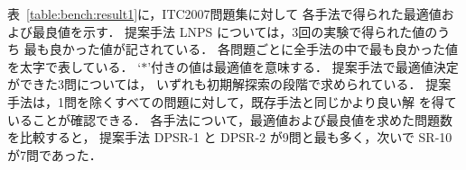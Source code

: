 
表~\ref{table:bench:result1}に，ITC2007問題集に対して
各手法で得られた最適値および最良値を示す．
提案手法 LNPS については，3回の実験で得られた値のうち
最も良かった値が記されている．
各問題ごとに全手法の中で最も良かった値を太字で表している．
`$\ast$'付きの値は最適値を意味する．
提案手法で最適値決定ができた3問については，
いずれも初期解探索の段階で求められている．
提案手法は，1問を除くすべての問題に対して，既存手法と同じかより良い解
を得ていることが確認できる．
各手法について，最適値および最良値を求めた問題数を比較すると，
提案手法 \textsf{DPSR-1} と \textsf{DPSR-2} が9問と最も多く，次いで
\textsf{SR-10}が7問であった．

